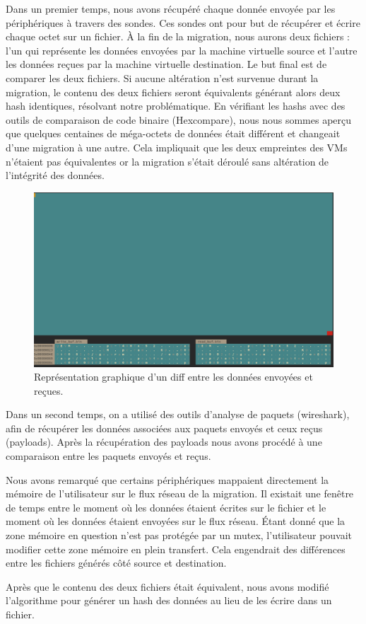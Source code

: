 Dans un premier temps, nous avons récupéré chaque donnée envoyée par les périphériques à travers des sondes.
Ces sondes ont pour but de récupérer et écrire chaque octet sur un fichier.
À la fin de la migration, nous aurons deux fichiers : l'un qui représente les données envoyées par la machine virtuelle source et l'autre les données reçues par la machine virtuelle destination.
Le but final est de comparer les deux fichiers. 
Si aucune altération n'est survenue durant la migration, le contenu des deux fichiers seront équivalents générant alors deux hash identiques, résolvant notre problématique.
En vérifiant les hashs avec des outils de comparaison de code binaire (Hexcompare), nous nous sommes aperçu que quelques centaines de méga-octets de données était différent et changeait d'une migration à une autre.
Cela impliquait que les deux empreintes des VMs n'étaient pas équivalentes or la migration s'était déroulé sans altération de l'intégrité des données.
\begin{figure}[H]
\centering
\includegraphics[scale=0.2]{include/haxcompare.png}
\caption{Représentation graphique d'un diff entre les données envoyées et reçues.}
\end{figure}


Dans un second temps, on a utilisé des outils d'analyse de paquets (wireshark), afin de récupérer les données associées aux paquets envoyés et ceux reçus (payloads).
Après la récupération des payloads nous avons procédé à une comparaison entre les paquets envoyés et reçus.




Nous avons remarqué que certains périphériques mappaient directement la mémoire de l'utilisateur sur le flux réseau de la migration.
Il existait une fenêtre de temps entre le moment où les données étaient écrites sur le fichier et le moment où les données étaient envoyées sur le flux réseau.
Étant donné que la zone mémoire en question n'est pas protégée par un mutex, l'utilisateur pouvait modifier cette zone mémoire en plein transfert.
Cela engendrait des différences entre les fichiers générés côté source et destination.


Après que le contenu des deux fichiers était équivalent, nous avons modifié l'algorithme pour générer un hash des données au lieu de les écrire dans un fichier.